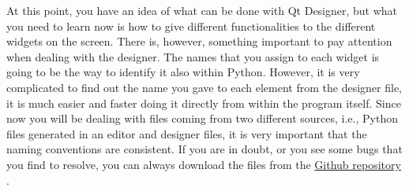 

At this point, you have an idea of what can be done with Qt Designer,
but what you need to learn now is how to give different functionalities
to the different widgets on the screen. There is, however, something
important to pay attention when dealing with the designer. The names
that you assign to each widget is going to be the way to identify it
also within Python. However, it is very complicated to find out the name
you gave to each element from the designer file, it is much easier and
faster doing it directly from within the program itself. Since now you
will be dealing with files coming from two different sources, i.e.,
Python files generated in an editor and designer files, it is very
important that the naming conventions are consistent. If you are in
doubt, or you see some bugs that you find to resolve, you can always
download the files from the
\href{https://github.com/PFTL/SimpleDaq/tree/master/PythonForTheLab/View/GUI}{Github
repository} .


